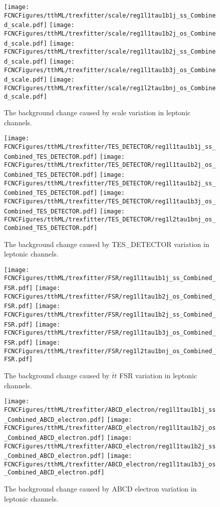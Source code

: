 \begin{figure}[H]
\centering
\texttt{[image: \\FCNCFigures/tthML/trexfitter/scale/reg1l1tau1b1j\_ss\_Combined\_scale.pdf]}
\texttt{[image: \\FCNCFigures/tthML/trexfitter/scale/reg1l1tau1b2j\_os\_Combined\_scale.pdf]}
\texttt{[image: \\FCNCFigures/tthML/trexfitter/scale/reg1l1tau1b2j\_ss\_Combined\_scale.pdf]}
\texttt{[image: \\FCNCFigures/tthML/trexfitter/scale/reg1l1tau1b3j\_os\_Combined\_scale.pdf]}
\texttt{[image: \\FCNCFigures/tthML/trexfitter/scale/reg1l2tau1bnj\_os\_Combined\_scale.pdf]}
\caption{The background change caused by scale variation in leptonic channels.}
\label{fig:tthML_scale}
\end{figure}

\begin{figure}[H]
\centering
\texttt{[image: \\FCNCFigures/tthML/trexfitter/TES\_DETECTOR/reg1l1tau1b1j\_ss\_Combined\_TES\_DETECTOR.pdf]}
\texttt{[image: \\FCNCFigures/tthML/trexfitter/TES\_DETECTOR/reg1l1tau1b2j\_os\_Combined\_TES\_DETECTOR.pdf]}
\texttt{[image: \\FCNCFigures/tthML/trexfitter/TES\_DETECTOR/reg1l1tau1b2j\_ss\_Combined\_TES\_DETECTOR.pdf]}
\texttt{[image: \\FCNCFigures/tthML/trexfitter/TES\_DETECTOR/reg1l1tau1b3j\_os\_Combined\_TES\_DETECTOR.pdf]}
\texttt{[image: \\FCNCFigures/tthML/trexfitter/TES\_DETECTOR/reg1l2tau1bnj\_os\_Combined\_TES\_DETECTOR.pdf]}
\caption{The background change caused by TES\_DETECTOR variation in leptonic channels.}
\label{fig:tthML_TES_DETECTOR}
\end{figure}

\begin{figure}[H]
\centering
\texttt{[image: \\FCNCFigures/tthML/trexfitter/FSR/reg1l1tau1b1j\_ss\_Combined\_FSR.pdf]}
\texttt{[image: \\FCNCFigures/tthML/trexfitter/FSR/reg1l1tau1b2j\_os\_Combined\_FSR.pdf]}
\texttt{[image: \\FCNCFigures/tthML/trexfitter/FSR/reg1l1tau1b2j\_ss\_Combined\_FSR.pdf]}
\texttt{[image: \\FCNCFigures/tthML/trexfitter/FSR/reg1l1tau1b3j\_os\_Combined\_FSR.pdf]}
\texttt{[image: \\FCNCFigures/tthML/trexfitter/FSR/reg1l2tau1bnj\_os\_Combined\_FSR.pdf]}
\caption{The background change caused by $\bar{t}t$ FSR variation in leptonic channels.}
\label{fig:tthML_FSR}
\end{figure}

\begin{figure}[H]
\centering
\texttt{[image: \\FCNCFigures/tthML/trexfitter/ABCD\_electron/reg1l1tau1b1j\_ss\_Combined\_ABCD\_electron.pdf]}
\texttt{[image: \\FCNCFigures/tthML/trexfitter/ABCD\_electron/reg1l1tau1b2j\_os\_Combined\_ABCD\_electron.pdf]}
\texttt{[image: \\FCNCFigures/tthML/trexfitter/ABCD\_electron/reg1l1tau1b2j\_ss\_Combined\_ABCD\_electron.pdf]}
\texttt{[image: \\FCNCFigures/tthML/trexfitter/ABCD\_electron/reg1l1tau1b3j\_os\_Combined\_ABCD\_electron.pdf]}
\caption{The background change caused by ABCD electron variation in leptonic channels.}
\label{fig:tthML_ABCD_electron}
\end{figure}

